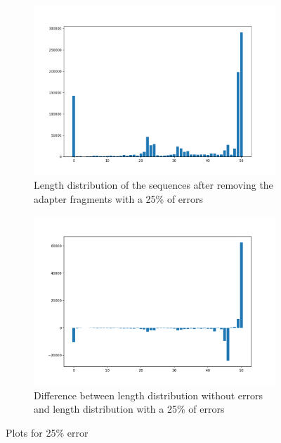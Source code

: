 \documentclass[a4paper,10pt]{article}
\begin{document}
\begin{figure}
    \centering
    \begin{subfigure}[b]{1\textwidth}
       \includegraphics[width=12cm]{images/length-distr-25.png}
       \caption{Length distribution of the sequences after removing the adapter fragments with a 25\% of errors}
       \label{fig:25} 
    \end{subfigure}
    
    \begin{subfigure}[b]{1\textwidth}
       \includegraphics[width=12cm]{images/length-distr-length-distr-25.png}
       \caption{Difference between length distribution without errors and length distribution with a 25\% of errors}
       \label{fig:diff25}
    \end{subfigure}
    
    \caption{Plots for 25\% error}
\end{figure}
\end{document}
